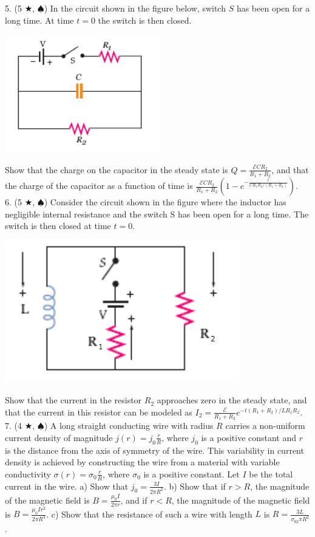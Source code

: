 5. (5 $\bigstar$, $\spadesuit$) In the circuit shown in the figure below, switch $S$ has been open for a long time. At time $t = 0$ the switch is then closed.
\begin{center}
	\includegraphics[scale=1]{images/em/RC-problem3.png}
\end{center}
Show that the charge on the capacitor in the steady state is $Q = \frac{\mathscr{E}CR_2}{R_1+R_2}$, and that the charge of the capacitor as a function of time is $\frac{\mathscr{E}CR_2}{R_1+R_2}(1- e^{-\frac{t}{CR_1R_2/(R_1+R_2)}})$.\\
6. (5 $\bigstar$, $\spadesuit$) Consider the circuit shown in the figure where the inductor has negligible
internal resistance and the switch S has been open for a long time. The switch is then closed at time $t=0$.
\begin{center}
	\includegraphics[scale=0.5]{images/em/LR-problem1.png}
\end{center}
Show that the current in the resistor $R_2$ approaches zero in the steady state, and that the current in this resistor can be modeled as $I_2 = \frac{\mathscr{E}}{R_1+R_2}e^{-t(R_1+R_2)/LR_1R_2}$.\\
7. (4 $\bigstar$, $\spadesuit$) A long straight conducting wire with radius $R$ carries a non-uniform current density of magnitude $j(r) = j_0\frac{r}{R}$, where $j_0$ is a positive constant and $r$ is the distance from the axis of symmetry of the wire. This variability in current density is achieved by constructing the wire from a material with variable conductivity $\sigma(r) = \sigma_0 \frac{r}{R}$, where $\sigma_0$ is a positive constant. Let $I$ be the total current in the wire. a) Show that $j_0 = \frac{3I}{2\pi R^2}$. b) Show that if $r>R$, the magnitude of the magnetic field is $B = \frac{\mu_0 I}{2\pi r}$, and if $r < R$, the magnitude of the magnetic field is $B = \frac{\mu_0 I r^2}{2\pi R^3}$. c) Show that the resistance of such a wire with length $L$ is $R = \frac{3L}{\sigma_02\pi R^2}$.\\
